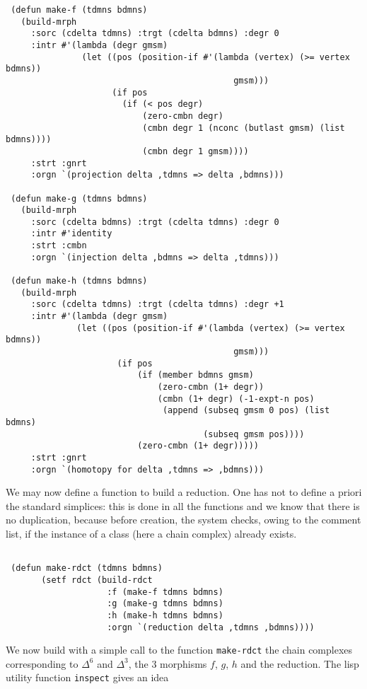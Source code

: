 \newpage
{\footnotesize\begin{verbatim}
 (defun make-f (tdmns bdmns)
   (build-mrph
     :sorc (cdelta tdmns) :trgt (cdelta bdmns) :degr 0
     :intr #'(lambda (degr gmsm)
               (let ((pos (position-if #'(lambda (vertex) (>= vertex bdmns))
                                             gmsm)))
                     (if pos
                       (if (< pos degr)
                           (zero-cmbn degr)
                           (cmbn degr 1 (nconc (butlast gmsm) (list bdmns))))
                           (cmbn degr 1 gmsm))))
     :strt :gnrt
     :orgn `(projection delta ,tdmns => delta ,bdmns)))

 (defun make-g (tdmns bdmns)
   (build-mrph
     :sorc (cdelta bdmns) :trgt (cdelta tdmns) :degr 0
     :intr #'identity
     :strt :cmbn
     :orgn `(injection delta ,bdmns => delta ,tdmns)))

 (defun make-h (tdmns bdmns)
   (build-mrph
     :sorc (cdelta tdmns) :trgt (cdelta tdmns) :degr +1
     :intr #'(lambda (degr gmsm)
              (let ((pos (position-if #'(lambda (vertex) (>= vertex bdmns))
                                             gmsm)))
                      (if pos
                          (if (member bdmns gmsm)
                              (zero-cmbn (1+ degr))
                              (cmbn (1+ degr) (-1-expt-n pos)
                               (append (subseq gmsm 0 pos) (list bdmns)
                                       (subseq gmsm pos))))
                          (zero-cmbn (1+ degr)))))
     :strt :gnrt
     :orgn `(homotopy for delta ,tdmns => ,bdmns)))
\end{verbatim}}
We may now define a function to build a reduction. One has not to define a priori the standard
simplices: this is done  in  all the functions and we know that there is no duplication, because
before creation, the system checks,
owing to the comment list, if the instance of a class (here a chain complex) already exists.
{\footnotesize\begin{verbatim}

 (defun make-rdct (tdmns bdmns)
       (setf rdct (build-rdct
                    :f (make-f tdmns bdmns)
                    :g (make-g tdmns bdmns)
                    :h (make-h tdmns bdmns)
                    :orgn `(reduction delta ,tdmns ,bdmns))))
\end{verbatim}}
We now build with a simple call to the function {\tt make-rdct} the chain complexes corresponding
to $\Delta^6$ and $\Delta^3$, the $3$ morphisms
$f$, $g$, $h$ and the reduction. The lisp utility function {\tt inspect} gives an idea
